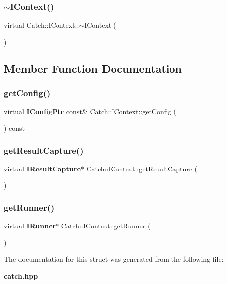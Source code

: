 \subsubsection{$\sim$IContext()}
{\footnotesize\ttfamily virtual Catch\+::\+I\+Context\+::$\sim$\+I\+Context (\begin{DoxyParamCaption}{ }\end{DoxyParamCaption})\hspace{0.3cm}{\ttfamily [virtual]}}



\subsection{Member Function Documentation}
\mbox{\label{struct_catch_1_1_i_context_a72a2718232adea8925fec9e71d3efd75}} 
\subsubsection{getConfig()}
{\footnotesize\ttfamily virtual \textbf{ I\+Config\+Ptr} const\& Catch\+::\+I\+Context\+::get\+Config (\begin{DoxyParamCaption}{ }\end{DoxyParamCaption}) const\hspace{0.3cm}{\ttfamily [pure virtual]}}

\mbox{\label{struct_catch_1_1_i_context_a684e4ae71d1fdf3060c352ecde1d122f}} 
\subsubsection{getResultCapture()}
{\footnotesize\ttfamily virtual \textbf{ I\+Result\+Capture}$\ast$ Catch\+::\+I\+Context\+::get\+Result\+Capture (\begin{DoxyParamCaption}{ }\end{DoxyParamCaption})\hspace{0.3cm}{\ttfamily [pure virtual]}}

\mbox{\label{struct_catch_1_1_i_context_af088415dde18d039ed5a2f95b02767c6}} 
\subsubsection{getRunner()}
{\footnotesize\ttfamily virtual \textbf{ I\+Runner}$\ast$ Catch\+::\+I\+Context\+::get\+Runner (\begin{DoxyParamCaption}{ }\end{DoxyParamCaption})\hspace{0.3cm}{\ttfamily [pure virtual]}}



The documentation for this struct was generated from the following file\+:\begin{DoxyCompactItemize}
\item 
\textbf{ catch.\+hpp}\end{DoxyCompactItemize}
